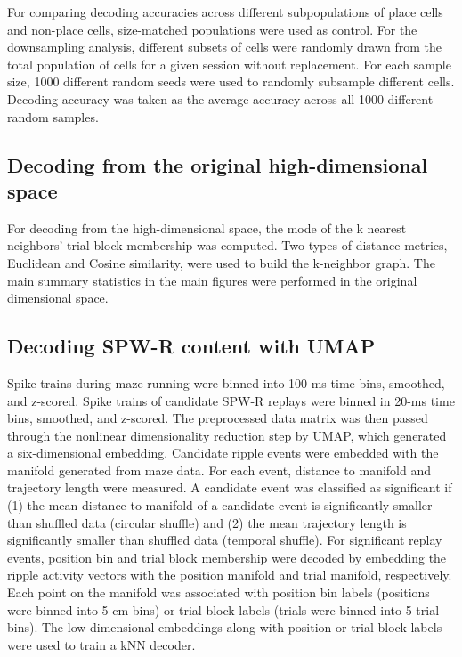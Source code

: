 For comparing decoding accuracies across different subpopulations of place cells and non-place cells, size-matched populations were used as control. For the downsampling analysis, different subsets of cells were randomly drawn from the total population of cells for a given session without replacement. For each sample size, 1000 different random seeds were used to randomly subsample different cells. Decoding accuracy was taken as the average accuracy across all 1000 different random samples.

\subsection{Decoding from the original high-dimensional space}

For decoding from the high-dimensional space, the mode of the k nearest neighbors' trial block membership was computed. Two types of distance metrics, Euclidean and Cosine similarity, were used to build the k-neighbor graph. The main summary statistics in the main figures were performed in the original dimensional space.

\subsection{Decoding SPW-R content with UMAP}

Spike trains during maze running were binned into 100-ms time bins, smoothed, and z-scored. Spike trains of candidate SPW-R replays were binned in 20-ms time bins, smoothed, and z-scored. The preprocessed data matrix was then passed through the nonlinear dimensionality reduction step by UMAP, which generated a six-dimensional embedding. Candidate ripple events were embedded with the manifold generated from maze data. For each event, distance to manifold and trajectory length were measured. A candidate event was classified as significant if (1) the mean distance to manifold of a candidate event is significantly smaller than shuffled data (circular shuffle) and (2) the mean trajectory length is significantly smaller than shuffled data (temporal shuffle). For significant replay events, position bin and trial block membership were decoded by embedding the ripple activity vectors with the position manifold and trial manifold, respectively. Each point on the manifold was associated with position bin labels (positions were binned into 5-cm bins) or trial block labels (trials were binned into 5-trial bins). The low-dimensional embeddings along with position or trial block labels were used to train a kNN decoder.

